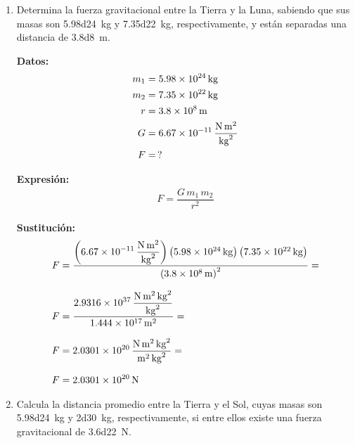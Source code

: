 \documentclass[14pt]{extarticle}
\begin{document}
\begin{enumerate}
\item Determina la fuerza gravitacional entre la Tierra y la Luna, sabiendo que sus masas son \SI{5.98d24}{\kilo\gram} y \SI{7.35d22}{\kilo\gram}, respectivamente, y están separadas una distancia de \SI{3.8d8}{\meter}.

\begin{minipage}[t]{0.5\linewidth}
\textbf{Datos:}
\begin{align*}
m_{1} &= \SI{5.98d24}{\kilo\gram} \\
m_{2} &= \SI{7.35d22}{\kilo\gram} \\
r &= \SI{3.8d8}{\meter} \\
G &= \SI[per-mode=fraction]{6.67d-11}{\newton\square\meter\per\square\kilo\gram} \\
F &= \, ?
\end{align*}
\end{minipage}
\hspace{1cm}
\begin{minipage}[t]{0.3\linewidth}
\textbf{Expresión:}
\begin{align*}
F = \dfrac{G \, m_{1} \, m_{2}}{r^{2}}
\end{align*}
\end{minipage}

\textbf{Sustitución:}
\begin{align*}
F &= \dfrac{\left( \displaystyle \SI[per-mode=fraction]{6.67d-11}{\newton\square\meter\per\square\kilo\gram} \right) \left( \SI{5.98d24}{\kilo\gram} \right) \left( \SI{7.35d22}{\kilo\gram} \right) }{\left( \SI{3.8d8}{\meter} \right)^{2} } = \\[0.75em]
F &= \dfrac{ \displaystyle \SI[per-mode=fraction]{2.9316d37}{\newton\square\meter\square\kilo\gram\per\square\kilo\gram}}{\SI{1.444d17}{\square\meter}} = \\[0.75em]
F &= \num{2.0301d20} \, \dfrac{\si{\newton\square\meter\square\kilo\gram}}{\si{\square\meter\square\kilo\gram}}  = \\[0.75em]
F &= \SI{2.0301d20}{\newton}
\end{align*}

\item Calcula la distancia promedio entre la Tierra y el Sol, cuyas masas son \break \hfill \SI{5.98d24}{\kilo\gram} y \SI{2d30}{\kilo\gram}, respectivamente, si entre ellos existe una fuerza gravitacional de \SI{3.6d22}{\newton}.


\end{enumerate}
\end{document}
